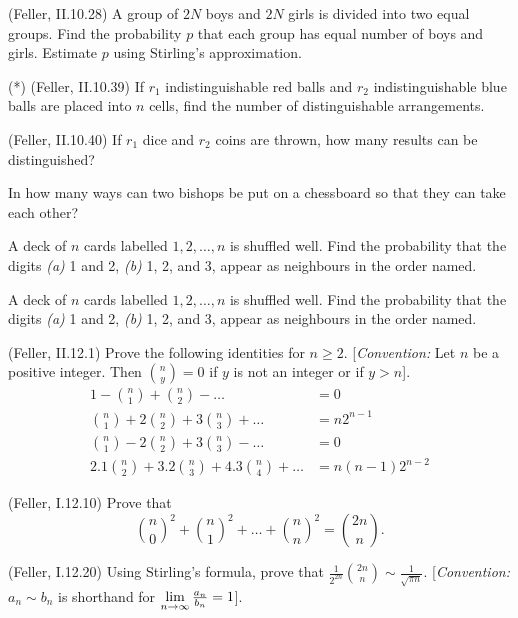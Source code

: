 \documentclass[preprint,  11pt]{amsart}
\begin{document}
\medskip
\bepr (Feller, II.10.28) A group of $2N$ boys and $2N$ girls is divided into two equal groups. Find the probability $p$ that each group has equal number of boys and girls. Estimate $p$ using Stirling's approximation.
\eepr

\medskip
\bepr (*) (Feller, II.10.39) If $r_{1}$ indistinguishable red balls and $r_{2}$ indistinguishable blue balls are placed into $n$ cells, find the number of distinguishable arrangements.
\eepr

\medskip
\bepr (Feller, II.10.40) If $r_{1}$ dice and $r_{2}$ coins are thrown, how many results can be distinguished?
\eepr



\medskip
\bepr  In how many ways can two bishops be put on a chessboard so that they can take each other?
\eepr

\medskip
\bepr A deck of $n$ cards labelled $1,2,\ldots ,n$ is shuffled well. Find the probability that the digits {\em (a)} 1 and 2,  {\em (b)} 1, 2, and 3,  \; appear as neighbours in the order named.
\eepr


\medskip
\bepr A deck of $n$ cards labelled $1,2,\ldots ,n$ is shuffled well. Find the probability that the digits {\em (a)} 1 and 2,  {\em (b)} 1, 2, and 3,  \; appear as neighbours in the order named.
\eepr


\medskip
\bepr (Feller, II.12.1) Prove the following identities for $n\ge 2$. [{\em Convention:} Let $n$ be a positive integer. Then $\binom{n}{y}=0$ if $y$ is not an integer or if $y>n$].
\begin{align*}
1-\binom{n}{1}+\binom{n}{2} -\ldots &=0 \\
\binom{n}{1}+2\binom{n}{2}+3\binom{n}{3}+\ldots &=n2^{n-1} \\
\binom{n}{1}-2\binom{n}{2}+3\binom{n}{3}-\ldots &=0 \\
2.1\binom{n}{2}+3.2\binom{n}{3}+4.3\binom{n}{4}+\ldots &=n(n-1)2^{n-2}
\end{align*}
\eepr

\medskip
\bepr (Feller, I.12.10) Prove that
$$
\binom{n}{0}^{2}+\binom{n}{1}^{2}+\ldots +\binom{n}{n}^{2}=\binom{2n}{n}.
$$
\eepr

\medskip
\bepr (Feller, I.12.20) Using Stirling's formula, prove that $\frac{1}{2^{2n}}\binom{2n}{n}\sim \frac{1}{\sqrt{\pi n}}$. [{\em Convention:} $a_{n}\sim b_{n}$ is shorthand for $\lim\limits_{n\rightarrow \infty}\frac{a_{n}}{b_{n}}=1$].
\eepr
\end{document}

